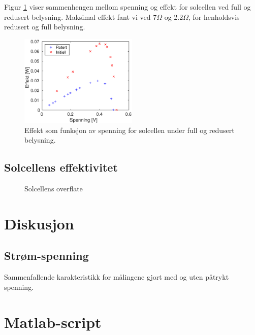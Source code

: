 \documentclass[a4paper,11pt, twocolumn]{article}
\begin{document}
Figur \ref{fig:effekt} viser sammenhengen mellom spenning og effekt for solcellen ved full og redusert belysning. Maksimal effekt fant vi ved 7$\Omega$ og 2.2$\Omega$, for henholdsvis redusert og full belysning.
\begin{figure}[!ht]
	\includegraphics[width = 0.5\textwidth]{matlab/LAB/optimalBelastning.eps}
	\caption{Effekt som funksjon av spenning for solcellen under full og redusert belysning.}
	\label{fig:effekt}
\end{figure}

\subsection{Solcellens effektivitet}
\begin{figure}[!ht]
\centering
	\caption{Solcellens overflate}
\end{figure}
\section{Diskusjon}
\subsection{Strøm-spenning}
Sammenfallende karakteristikk for målingene gjort med og uten påtrykt spenning.

\clearpage
\onecolumn
\appendix


\section{Matlab-script}
\end{document}
